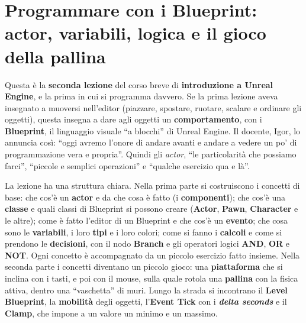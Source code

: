 %
%    
%

\chapter[Programmare con i Blueprint]{Programmare con i Blueprint: actor, variabili,
logica e il gioco della pallina}
\label{ue2:cap:blueprint}

Questa è la \textbf{seconda lezione} del corso breve di \textbf{introduzione a Unreal
Engine}, e la prima in cui si programma davvero. Se la prima lezione aveva insegnato a
muoversi nell'editor (piazzare, spostare, ruotare, scalare e ordinare gli oggetti),
questa insegna a dare agli oggetti un \textbf{comportamento}, con i
\textbf{Blueprint}, il linguaggio visuale ``a blocchi'' di Unreal Engine. Il docente,
Igor, lo annuncia così: ``oggi avremo l'onore di andare avanti e andare a vedere un po'
di programmazione vera e propria''. Quindi gli \emph{actor}, ``le particolarità che
possiamo farci'', ``piccole e semplici operazioni'' e ``qualche esercizio qua e là''.

La lezione ha una struttura chiara. Nella prima parte si costruiscono i concetti di
base: che cos'è un \textbf{actor} e da che cosa è fatto (i \textbf{componenti}); che
cos'è una \textbf{classe} e quali classi di Blueprint si possono creare
(\textbf{Actor}, \textbf{Pawn}, \textbf{Character} e le altre); come è fatto l'editor
di un Blueprint e che cos'è un \textbf{evento}; che cosa sono le \textbf{variabili}, i
loro \textbf{tipi} e i loro colori; come si fanno i \textbf{calcoli} e come si prendono
le \textbf{decisioni}, con il nodo \textbf{Branch} e gli operatori logici
\textbf{AND}, \textbf{OR} e \textbf{NOT}. Ogni concetto è accompagnato da un piccolo
esercizio fatto insieme. Nella seconda parte i concetti diventano un piccolo gioco: una
\textbf{piattaforma} che si inclina con i tasti, e poi con il mouse, sulla quale rotola
una \textbf{pallina} con la fisica attiva, dentro una ``vaschetta'' di muri. Lungo la
strada si incontrano il \textbf{Level Blueprint}, la \textbf{mobilità} degli oggetti,
l'\textbf{Event Tick} con i \textbf{\emph{delta seconds}} e il \textbf{Clamp}, che
impone a un valore un minimo e un massimo.

